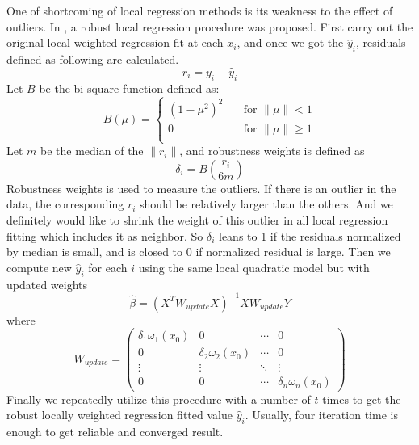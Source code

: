 One of shortcoming of local regression methods is its weakness to the effect of 
outliers. In \cite{Cleveland:1979}, a robust local regression procedure was 
proposed. First carry out the original local weighted regression fit at each 
$x_i$, and once we got the $\hat y_i$, residuals defined as following are 
calculated.
\begin{equation}
r_i = y_i - \hat y_i
\end{equation}
Let $B$ be the bi-square function defined as:
\begin{equation} 
B(\mu) =
  \begin{cases}
    (1 - \mu^2)^2      & \quad \text{for } \|\mu\| < 1\\
    0  & \quad \text{for } \|\mu\| \ge 1\\
  \end{cases}
\end{equation}
Let $m$ be the median of the $\|r_i\|$, and robustness weights is defined as
\begin{equation}
\delta_i = B\left(\frac{r_i}{6m}\right)
\end{equation}
Robustness weights is used to measure the outliers. If there is an outlier in 
the data, the corresponding $r_i$ should be relatively larger than the others.
And we definitely would like to shrink the weight of this outlier in all local
regression fitting which includes it as neighbor. So $\delta_i$ leans to 1
if the residuals normalized by median is small, and is closed to 0 if normalized
residual is large. Then we compute new $\hat y_i$ for each $i$ using the same
local quadratic model but with updated weights
\begin{equation}
\hat \beta = (X^TW_{update}X)^{-1}XW_{update}Y
\end{equation}
where
\begin{equation}
W_{update} =  
\begin{pmatrix}
  \delta_1\omega_1(x_0) & 0 & \cdots & 0 \\
  0 & \delta_2\omega_2(x_0) & \cdots & 0 \\
  \vdots  & \vdots & \ddots & \vdots  \\
  0 & 0 & \cdots & \delta_n\omega_n(x_0) 
\end{pmatrix}
\end{equation}
Finally we repeatedly utilize this procedure with a number of $t$ times to get
the robust locally weighted regression fitted value $\hat y_i$. Usually, four
iteration time is enough to get reliable and converged result.

